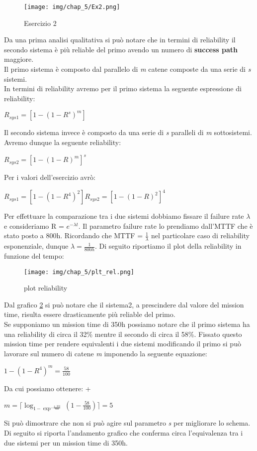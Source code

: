 \begin{figure}[H]
    \centering
    \texttt{[image: img/chap\_5/Ex2.png]}
    \caption{Esercizio 2}
    \label{fig:Ex_2}
\end{figure}
\noindent
Da una prima analisi qualitativa si può notare che in termini di reliability il secondo sistema è più reliable del primo avendo un numero di \textbf{success path} maggiore.\\
Il primo sistema è composto dal parallelo di \textit{m} catene composte da una serie di \textit{s} sistemi.\\
In termini di reliability avremo per il primo sistema la seguente espressione di reliability:
\begin{center}
    $
        R_{sys1} = [1-(1-R^s)^m]
    $
\end{center}
Il secondo sistema invece è composto da una serie di \textit{s} paralleli di \textit{m} sottosistemi.\\
Avremo dunque la seguente reliability:
\begin{center}
    $
        R_{sys2} = [1-(1-R)^m]^s
    $
\end{center}
Per i valori dell'esercizio avrò:
\begin{center}
    $
    R_{sys1} = [1-(1-R^4)^2] 
    R_{sys2} = [1-(1-R)^2]^4 
    $
\end{center}
Per effettuare la comparazione tra i due sistemi dobbiamo fissare il failure rate $\lambda$ e consideriamo R = $e^{-\lambda t}$.
Il parametro failure rate lo prendiamo dall'MTTF che è stato posto a 800h.
Ricordando che MTTF = $\frac{1}{\lambda}$ nel particolare caso di reliability esponenziale, dunque $\lambda = \frac{1}{800h}$. 
Di seguito riportiamo il plot della reliability in funzione del tempo:

\begin{figure}[H]
    \centering
    \texttt{[image: img/chap\_5/plt\_rel.png]}
    \caption{plot reliability}
    \label{fig:plt_rel}
\end{figure}
\noindent
Dal grafico \ref{fig:plt_rel} si può notare che il sistema2, a prescindere dal valore del mission time, risulta essere drasticamente più reliable del primo.\\
Se supponiamo un mission time di 350h possiamo notare che il primo sistema ha una reliability di circa il 32\% mentre il secondo di circa il 58\%.
Fissato questo mission time per rendere equivalenti i due sistemi modificando il primo si può lavorare sul numero di catene \textit{m} imponendo la seguente equazione:
\begin{center}
    $
    1-(1-R^4)^m = \frac{58}{100}
    $
\end{center}
Da cui possiamo ottenere: 
+\begin{center}
    $
    m = \lceil \log_{1-\exp^{-\frac{4 \cdot 350}{800}}}(1-\frac{58}{100})\rceil = 5
    $
\end{center}
Si può dimostrare che non si può agire sul parametro \textit{s} per migliorare lo schema.\\
Di seguito si riporta l'andamento grafico che conferma circa l'equivalenza tra i due sistemi per un mission time di 350h. 

